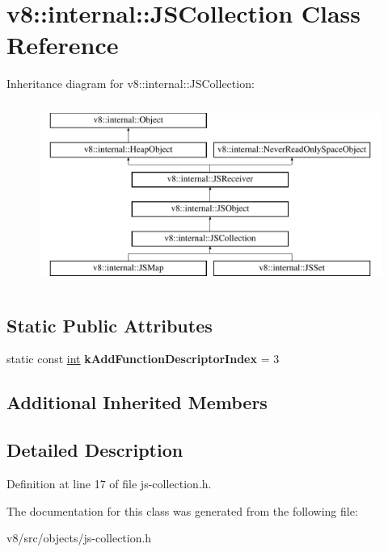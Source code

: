 \hypertarget{classv8_1_1internal_1_1JSCollection}{}\section{v8\+:\+:internal\+:\+:J\+S\+Collection Class Reference}
\label{classv8_1_1internal_1_1JSCollection}
Inheritance diagram for v8\+:\+:internal\+:\+:J\+S\+Collection\+:\begin{figure}[H]
\begin{center}
\leavevmode
\includegraphics[height=6.000000cm]{classv8_1_1internal_1_1JSCollection}
\end{center}
\end{figure}
\subsection*{Static Public Attributes}
\begin{DoxyCompactItemize}
\item 
\mbox{\label{classv8_1_1internal_1_1JSCollection_a74e78fe5d6a061e305e3d10fffc9d65d}} 
static const \mbox{\hyperlink{classint}{int}} {\bfseries k\+Add\+Function\+Descriptor\+Index} = 3
\end{DoxyCompactItemize}
\subsection*{Additional Inherited Members}


\subsection{Detailed Description}


Definition at line 17 of file js-\/collection.\+h.



The documentation for this class was generated from the following file\+:\begin{DoxyCompactItemize}
\item 
v8/src/objects/js-\/collection.\+h\end{DoxyCompactItemize}
